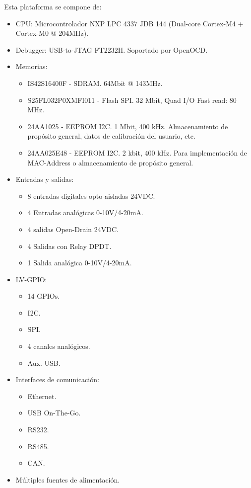 \noindent Esta plataforma se compone de:

\begin{itemize}
\item
CPU: Microcontrolador NXP LPC 4337 JDB 144 (Dual-core Cortex-M4 + Cortex-M0 @ 204MHz).
\item
Debugger: USB-to-JTAG FT2232H. Soportado por OpenOCD.
\item
Memorias: 
   \begin{itemize}
   \item
   IS42S16400F - SDRAM. 64Mbit @ 143MHz.
   \item
   S25FL032P0XMFI011 - Flash SPI. 32 Mbit, Quad I/O Fast read: 80 MHz.
   \item
   24AA1025 - EEPROM I2C. 1 Mbit, 400 kHz. Almacenamiento de propósito general, datos de calibración del usuario, etc.
   \item
   24AA025E48 - EEPROM I2C. 2 kbit, 400 kHz. Para implementación de MAC-Address o almacenamiento de propósito general.
   \end{itemize}
\item
Entradas y salidas:   
   \begin{itemize}
   \item
   8 entradas digitales opto-aisladas 24VDC.
   \item
   4 Entradas analógicas 0-10V/4-20mA.
   \item
   4 salidas Open-Drain 24VDC.
   \item
   4 Salidas con Relay DPDT.
   \item
   1 Salida analógica 0-10V/4-20mA.
   \end{itemize}
\item
LV-GPIO:
   \begin{itemize}
   \item
   14 GPIOs.
   \item
   I2C.
   \item
   SPI.
   \item
   4 canales analógicos.
   \item
   Aux. USB.
   \end{itemize}
\item
Interfaces de comunicación:
   \begin{itemize}
   \item
   Ethernet.
   \item
   USB On-The-Go.
   \item
   RS232.
   \item
   RS485.
   \item
   CAN.
   \end{itemize}
\item
Múltiples fuentes de alimentación.

\end{itemize}

